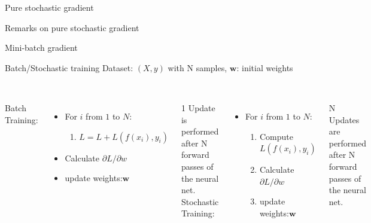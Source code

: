 \documentclass[handout]{beamer}
\begin{document}
\begin{frame}{Pure stochastic gradient}
    
\end{frame}

\begin{frame}{Remarks on pure stochastic gradient}
    
\end{frame}

\begin{frame}{Mini-batch gradient}
    
\end{frame}

\begin{frame}{Batch/Stochastic training}
Dataset: $(X,y)$ with N samples, $\mathbf{w}$: initial weights\\~\\
\begin{columns}[t]
\alert{Batch Training:}
\begin{itemize}
    \item For $i$ from $1$ to $N$:\\
    \begin{enumerate}
    \item    $L = L + L(f(x_i),y_i)$
     \end{enumerate}
    \item Calculate $\partial L/\partial w$
    \item update weights:$\mathbf{w}$
    
\end{itemize}
\alert{1 Update is performed after N forward passes of the neural net.}
\pause
{}
\alert{Stochastic Training:}
\begin{itemize}
 \item For $i$ from $1$ to $N$:\\
     \begin{enumerate}

    \item Compute $L(f(x_i),y_i)$\\
    \item Calculate $\partial L/\partial w$\\
    \item update weights:$\mathbf{w}$
    \end{enumerate}
\end{itemize}

\alert{N Updates are performed after N forward passes of the neural net.}
\end{columns}
    
\end{frame}
\end{document}
